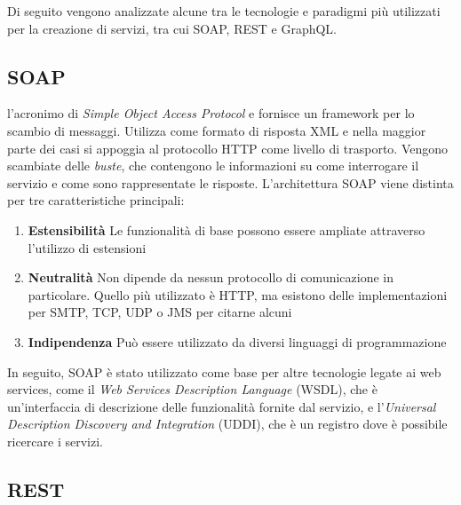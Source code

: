 Di seguito vengono analizzate alcune tra le tecnologie e paradigmi più utilizzati per la creazione di servizi, tra cui SOAP, REST e GraphQL.

\subsection{SOAP\label{sec:soap-introduzione}}

\upe l'acronimo di \emph{Simple Object Access Protocol} e fornisce un framework per lo scambio di messaggi.  Utilizza come formato di risposta XML e nella maggior parte dei casi si appoggia al protocollo HTTP come livello di trasporto. Vengono scambiate delle \emph{buste}, che contengono le informazioni su come interrogare il servizio e come sono rappresentate le risposte. L'architettura SOAP viene distinta per tre caratteristiche principali:

\begin{enumerate}
	\item \textbf{Estensibilità} Le funzionalità di base possono essere ampliate attraverso l'u\-ti\-liz\-zo di estensioni
	\item \textbf{Neutralità} Non dipende da nessun protocollo di comunicazione in particolare. Quello più utilizzato è HTTP, ma esistono delle implementazioni per SMTP, TCP, UDP o JMS per citarne alcuni
	\item \textbf{Indipendenza} Può essere utilizzato da diversi linguaggi di programmazione
\end{enumerate}

In seguito, SOAP è stato utilizzato come base per altre tecnologie legate ai web services, come il \emph{Web Services Description Language} (WSDL), che è un'interfaccia di descrizione delle funzionalità fornite dal servizio, e l'\emph{Universal Description Discovery and Integration} (UDDI), che è un registro dove è possibile ricercare i servizi.

\subsection{REST\label{sec:rest-introduzione}}

